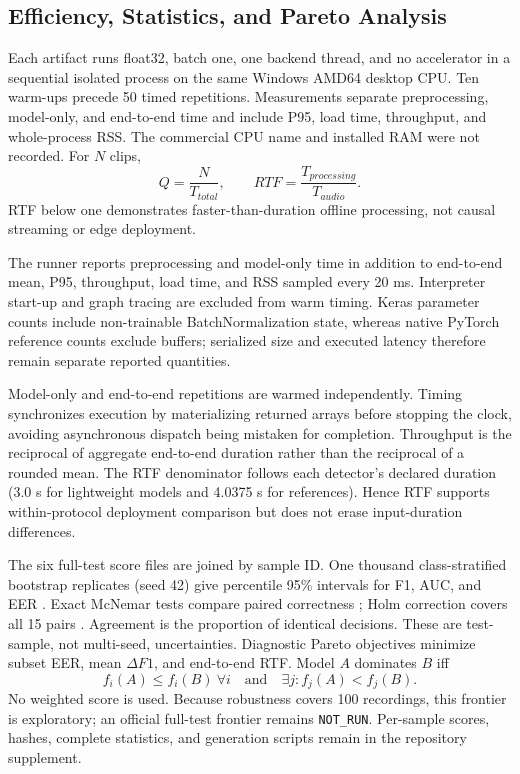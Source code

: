 \documentclass[10pt,journal,onecolumn,a4paper]{IEEEtran}
\begin{document}
\subsection{Efficiency, Statistics, and Pareto Analysis}
Each artifact runs float32, batch one, one backend thread, and no accelerator in a sequential isolated process on the same Windows AMD64 desktop CPU. Ten warm-ups precede 50 timed repetitions. Measurements separate preprocessing, model-only, and end-to-end time and include P95, load time, throughput, and whole-process RSS. The commercial CPU name and installed RAM were not recorded. For $N$ clips,
\begin{equation}
Q=\frac{N}{T_{total}},\qquad RTF=\frac{T_{processing}}{T_{audio}}.
\label{eq:efficiency}
\end{equation}
RTF below one demonstrates faster-than-duration offline processing, not causal streaming or edge deployment.

The runner reports preprocessing and model-only time in addition to end-to-end mean, P95, throughput, load time, and RSS sampled every 20 ms. Interpreter start-up and graph tracing are excluded from warm timing. Keras parameter counts include non-trainable BatchNormalization state, whereas native PyTorch reference counts exclude buffers; serialized size and executed latency therefore remain separate reported quantities.

Model-only and end-to-end repetitions are warmed independently. Timing synchronizes execution by materializing returned arrays before stopping the clock, avoiding asynchronous dispatch being mistaken for completion. Throughput is the reciprocal of aggregate end-to-end duration rather than the reciprocal of a rounded mean. The RTF denominator follows each detector's declared duration (3.0 s for lightweight models and 4.0375 s for references). Hence RTF supports within-protocol deployment comparison but does not erase input-duration differences.

The six full-test score files are joined by sample ID. One thousand class-stratified bootstrap replicates (seed 42) give percentile 95\% intervals for F1, AUC, and EER \cite{efron1979bootstrap}. Exact McNemar tests compare paired correctness \cite{mcnemar1947}; Holm correction covers all 15 pairs \cite{holm1979}. Agreement is the proportion of identical decisions. These are test-sample, not multi-seed, uncertainties. Diagnostic Pareto objectives minimize subset EER, mean $\Delta F1$, and end-to-end RTF. Model $A$ dominates $B$ iff
\begin{equation}
f_i(A)\le f_i(B)\ \forall i\quad\mathrm{and}\quad\exists j:f_j(A)<f_j(B).
\label{eq:pareto}
\end{equation}
No weighted score is used. Because robustness covers 100 recordings, this frontier is exploratory; an official full-test frontier remains \texttt{NOT\_RUN}. Per-sample scores, hashes, complete statistics, and generation scripts remain in the repository supplement.
\end{document}
